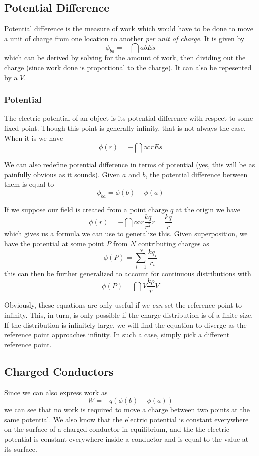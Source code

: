 \documentclass[12pt]{article}
\begin{document}
\subsection*{Potential Difference}
Potential difference is the measure of work which would have to be done to move a unit of charge from one location to another \emph{per unit of charge}. It is given by \[ \phi_{ba} = - \dint{a}{b}{E}{s} \] which can be derived by solving for the amount of work, then dividing out the charge (since work done is proportional to the charge). It can also be repesented by a $V$.

\subsubsection*{Potential}
The electric potential of an object is its potential difference with respect to some fixed point. Though this point is generally infinity, that is not always the case. When it is we have \[ \phi(r) = - \dint{\infty}{r}{E}{s} \]

We can also redefine potential difference in terms of potential (yes, this will be as painfully obvious as it sounds). Given $a$ and $b$, the potential difference between them is equal to \[ \phi_{ba} = \phi(b) - \phi(a) \]

If we suppose our field is created from a point charge $q$ at the origin we have \[ \phi(r) = - \dint{\infty}{r}{\frac{kq}{r^2}}{r} = \frac{kq}{r} \] which gives us a formula we can use to generalize this. Given superposition, we have the potential at some point $P$ from $N$ contributing charges as \[ \phi(P) = \sum_{i = 1}^N \frac{kq_i}{r_i} \] this can then be further generalized to account for continuous distributions with \[ \phi(P) = \dint{V}{}{\frac{k \rho}{r}}{V} \]

Obviously, these equations are only useful if we \emph{can} set the reference point to infinity. This, in turn, is only possible if the charge distribution is of a finite size. If the distribution is infinitely large, we will find the equation to diverge as the reference point approaches infinity. In such a case, simply pick a different reference point.

\subsection*{Charged Conductors}
Since we can also express work as \[ W = -q(\phi(b) - \phi(a)) \] we can see that no work is required to move a charge between two points at the same potential. We also know that the electric potential is constant everywhere on the surface of a charged conductor in equilibrium, and the the electric potential is constant everywhere inside a conductor and is equal to the value at its surface.
\end{document}
